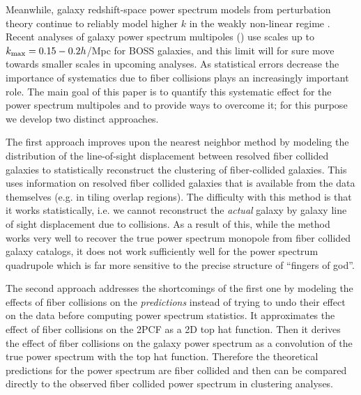 Meanwhile, galaxy redshift-space power spectrum models from perturbation theory continue to 
reliably model higher $k$ in the weakly non-linear regime
\citep{Taruya:2010aa, Taruya:2014aa, Okumura:2015aa, Beutler:2016aa, Grieb:2016aa, Sanchez:2016aa}.
Recent analyses of galaxy power spectrum 
multipoles (\citealt{Beutler:2014aa, Gil-Marin:2014aa, Gil-Marin:2016ab, Gil-Marin:2016aa, Beutler:2016aa, Grieb:2016aa}) use scales up to $k_{\rm max}=0.15-0.2 h$/Mpc for BOSS galaxies, and this limit will for sure move towards smaller scales in upcoming analyses. As statistical errors decrease the importance of systematics due to fiber collisions plays an increasingly important role. The main goal of this paper is to quantify this systematic effect for the power spectrum multipoles and to provide ways to overcome it; for this purpose we
develop two distinct approaches. 

The first approach improves upon the nearest neighbor method by modeling the 
distribution of the line-of-sight displacement between resolved fiber collided 
galaxies to statistically reconstruct the clustering of fiber-collided galaxies. 
This uses information on resolved fiber collided galaxies that is available from 
the data themselves (e.g. in tiling overlap regions). The difficulty with this 
method is that it works statistically, i.e. we cannot reconstruct the {\em actual} 
galaxy by galaxy line of sight displacement due to collisions. As a result of this, 
while the method works very well to recover the true power spectrum monopole 
from fiber collided galaxy catalogs, it does not work sufficiently well for the 
power spectrum quadrupole which is far more sensitive to the precise structure of ``fingers of god''. 

The second approach addresses the shortcomings of the first one by modeling the effects of fiber collisions on the {\em predictions} instead of trying to undo their effect on the data before computing power spectrum statistics. It approximates the effect of fiber collisions on the 2PCF as 
a 2D top hat function. Then it derives the effect of fiber collisions on the galaxy power spectrum as a 
convolution of the true power spectrum with the top hat function. Therefore the theoretical predictions for the power spectrum are fiber collided and then can be compared  directly to the observed fiber collided power spectrum in clustering analyses. 

